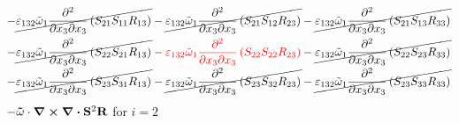 \begin{equation}
\begin{split}
		-\cancel{\varepsilon_{132}\tilde{\omega}_{1}\pdv{}{x_{3}}{x_{3}}\left(S_{21}S_{11}R_{13}\right)}
		-\cancel{\varepsilon_{132}\tilde{\omega}_{1}\pdv{}{x_{3}}{x_{3}}\left(S_{21}S_{12}R_{23}\right)}
		-\cancel{\varepsilon_{132}\tilde{\omega}_{1}\pdv{}{x_{3}}{x_{3}}\left(S_{21}S_{13}R_{33}\right)}\\
		-\cancel{\varepsilon_{132}\tilde{\omega}_{1}\pdv{}{x_{3}}{x_{3}}\left(S_{22}S_{21}R_{13}\right)}
		-{\color{red}\varepsilon_{132}\tilde{\omega}_{1}\pdv{}{x_{3}}{x_{3}}\left(S_{22}S_{22}R_{23}\right)}
		-\cancel{\varepsilon_{132}\tilde{\omega}_{1}\pdv{}{x_{3}}{x_{3}}\left(S_{22}S_{23}R_{33}\right)}\\
		-\cancel{\varepsilon_{132}\tilde{\omega}_{1}\pdv{}{x_{3}}{x_{3}}\left(S_{23}S_{31}R_{13}\right)}
		-\cancel{\varepsilon_{132}\tilde{\omega}_{1}\pdv{}{x_{3}}{x_{3}}\left(S_{23}S_{32}R_{23}\right)}
		-\cancel{\varepsilon_{132}\tilde{\omega}_{1}\pdv{}{x_{3}}{x_{3}}\left(S_{23}S_{33}R_{33}\right)}\\
	\end{split}
\end{equation}
$-\mathbf{\tilde{\omega}}\cdot\curl \div \mathbf{S}^2 \mathbf{R}$ for $i=2$
